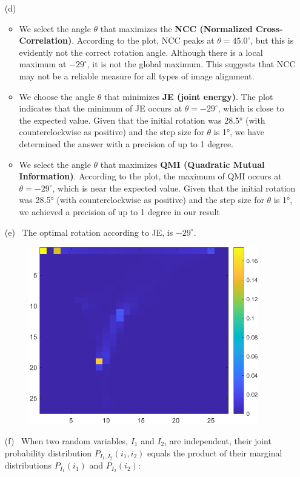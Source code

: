 \documentclass[11pt]{article}
\begin{document}
\begin{enumerate}
\begin{enumerate}
\pagebreak
\item [(d)] \
\begin{itemize}
  \item We select the angle $\theta$ that maximizes the \textbf{NCC (Normalized Cross-Correlation)}. According to the plot, NCC peaks at $\theta = 45.0^\circ$, but this is evidently not the correct rotation angle. Although there is a local maximum at $-29^\circ$, it is not the global maximum. This suggests that NCC may not be a reliable measure for all types of image alignment.
  \item We choose the angle $\theta$ that minimizes \textbf{JE (joint energy)}. The plot indicates that the minimum of JE occurs at $\theta = -29^\circ$, which is close to the expected value. Given that the initial rotation was 28.5° (with counterclockwise as positive) and the step size for $\theta$ is 1°, we have determined the answer with a precision of up to 1 degree.
  \item  We select the angle $\theta$ that maximizes \textbf{QMI (Quadratic Mutual Information)}. According to the plot, the maximum of QMI occurs at $\theta = -29^\circ$, which is near the expected value. Given that the initial rotation was 28.5° (with counterclockwise as positive) and the step size for $\theta$ is 1°, we achieved a precision of up to 1 degree in our result
\end{itemize}

\item [(e)] \
The optimal rotation according to JE, is $-29^\circ$.
\begin{figure}[!htb]
\centering
\includegraphics[width=100mm]{../images/op_JE_hist.png}
\end{figure}
\item [(f)] \
When two random variables, \( I_1 \) and \( I_2 \), are independent, their joint probability distribution \( P_{I_1, I_2}(i_1, i_2) \) equals the product of their marginal distributions \( P_{I_1}(i_1) \) and \( P_{I_2}(i_2) \):


\end{enumerate}
\end{enumerate}
\end{document}
